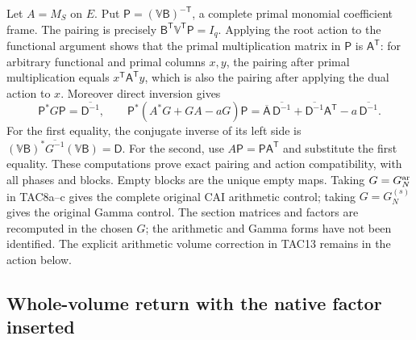 \documentclass[11pt,a4paper]{article}
\begin{document}
Let $A=M_S$ on $E$. Put $\mathsf P=(\mathbb V\mathsf B)^{-\mathsf T}$, a complete
primal monomial coefficient frame. The pairing is precisely
$\mathsf B^{\mathsf T}\mathbb V^{\mathsf T}\mathsf P=I_q$.
Applying the root action to the functional argument shows that the
primal multiplication matrix in $\mathsf P$ is $\mathsf A^{\mathsf T}$:
for arbitrary functional and primal columns $x,y$, the pairing after
primal multiplication equals $x^{\mathsf T}\mathsf A^{\mathsf T}y$,
which is also the pairing after applying the dual action to $x$.
Moreover direct inversion gives
\[
 \mathsf P^*G\mathsf P=\overline{\mathsf D^{-1}},\qquad
 \mathsf P^*(A^*G+GA-aG)\mathsf P
   =\overline{\mathsf A}\,\overline{\mathsf D^{-1}}
      +\overline{\mathsf D^{-1}}\mathsf A^{\mathsf T}
      -a\,\overline{\mathsf D^{-1}}.
 \tag{TAC8c}
\]
For the first equality, the conjugate inverse of its left side is
$(\mathbb V\mathsf B)^*\overline{G^{-1}}(\mathbb V\mathsf B)
=\mathsf D$. For the second, use $A\mathsf P=\mathsf P\mathsf A^{\mathsf T}$
and substitute the first equality. These computations prove exact
pairing and action compatibility, with all phases and blocks.
Empty blocks are the unique empty maps. Taking $G=G_N^{\rm ar}$
in TAC8a--c gives the complete original CAI arithmetic control;
taking $G=G_N^{(s)}$ gives the original Gamma control. The section
matrices and factors are recomputed in the chosen $G$; the arithmetic
and Gamma forms have not been identified. The explicit arithmetic
volume correction in TAC13 remains in the action below.

\subsection{Whole-volume return with the native factor inserted}
\end{document}
